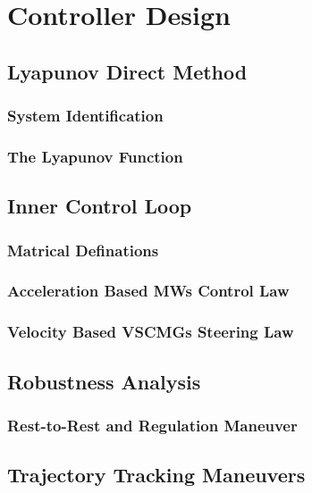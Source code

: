 \chapter{Controller Design}
\label{chap:4}

\section{Lyapunov Direct Method}
\subsection{System Identification}
\subsection{The Lyapunov Function}
\section{Inner Control Loop}
\subsection{Matrical Definations}
\subsection{Acceleration Based MWs Control Law}
\subsection{Velocity Based VSCMGs Steering Law}
\section{Robustness Analysis}
\subsection{Rest-to-Rest and Regulation Maneuver}
\section{Trajectory Tracking Maneuvers}
